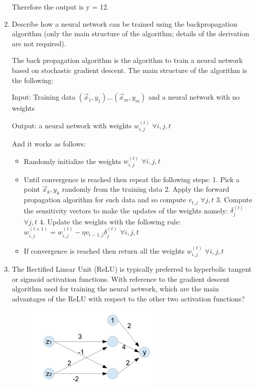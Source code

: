 \documentclass[a4paper,11pt,oneside]{book}
\begin{document}
\begin{enumerate}
\begin{solution}
                Therefore the output is y = 12.
        \end{solution}
    
    \clearpage
    \item Describe how a neural network can be trained using the backpropagation algorithm (only the main structure of the algorithm; details of the derivation are not required).
        \begin{solution}
            The back propagation algorithm is the algorithm to train a neural network based on stochastic gradient descent. The main structure of the algorithm is the following:
            
            Input: Training data $(\vec{x}_1,y_1)...(\vec{x}_m,y_m)$ and a neural network with no weights
            
            Output: a neural network with weights $w_{i,j}^{(t)}$ $\forall i,j,t$
            
            And it works as follows:
            \begin{itemize}
            \item Randomly initialize the weights $w_{i,j}^{(t)}$ $\forall i,j,t$
            \item Until convergence is reached then repeat the following steps:
            1. Pick a point $\vec{x}_k,y_k$ randomly from the training data
            2. Apply the forward propagation algorithm for such data and so compute $v_{t,j}$ $\forall j,t$
            3. Compute the sensitivity vectors to make the updates of the weights namely: $\delta_j^{(t)}$ $\forall j,t$
            4. Update the weights with the following rule: $w_{i,j}^{(t+1)} = w_{i,j}^{(t)} - \eta v_{t-1,j}\delta_j^{(t)}$ $\forall i,j,t$
            \item If convergence is reached then return all the weights $w_{i,j}^{(t)}$ $\forall i,j,t$
            \end{itemize}
        \end{solution}
    \clearpage
    \item The Rectified Linear Unit (ReLU) is typically preferred to hyperbolic tangent or sigmoid activation functions. With reference to the gradient descent algorithm used for training the neural network, which are the main advantages of the ReLU with respect to the other two activation functions?

        \begin{figure}[H]
        \centering
        \includegraphics[width=0.6\textwidth,height=0.4\textheight,keepaspectratio]{images/3_1_July_2019.png}
        \end{figure}
        \end{enumerate}
\end{document}
